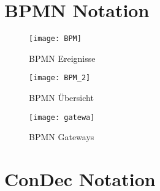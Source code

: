 \chapter{BPMN Notation}


\begin{figure}[!htbp]
\begin{center}
  \texttt{[image: BPM]} %
  \caption{BPMN Ereignisse}
  \label{fig:BPM}
\end{center}
\end{figure}

\begin{figure}[!htbp]
\begin{center}
  \texttt{[image: BPM\_2]} %
  \caption{BPMN Übersicht}
  \label{fig:BPM_2}
\end{center}
\end{figure}

\begin{figure}[!htbp]
\begin{center}
  \texttt{[image: gatewa]} %
  \caption{BPMN Gateways}
  \label{fig:gateways}
\end{center}
\end{figure}

\chapter{ConDec Notation}

 
 
